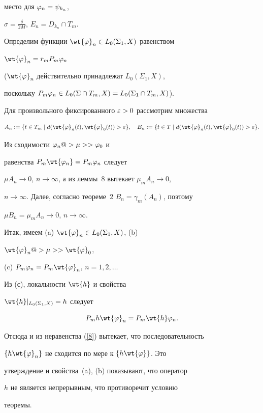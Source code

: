 \begin{pf}
место для $\varphi_n=\psi_{k_n}$,


$\sigma=\frac{\delta}{2M}$, $E_n=D_{k_n}\cap T_m$.





Определим функции $\wt{\f}_n\in L_0(\Sigma_1,X)$ равенством


$\wt{\f}_n=r_mP_m\f_n$


($\wt{\f}_n$ действительно принадлежат $L_0(\Sigma_1,X)$,


поскольку $P_m\varphi_n\in L_0(\Sigma\cap T_m,X)=L_0(\Sigma_1\cap T_m,X)$).


Для произвольного фиксированного $\varepsilon >0$ рассмотрим множества


$$


A_n:=\{t\in T_m\mid d(\wt{\f}_n(t),\wt{\f}_0(t))>\e\}, \quad


B_n:=\{t\in T\mid d(\wt{\f}_n(t),\wt{\f}_0(t))>\e\}.


$$


Из сходимости $\varphi_n@>{\mu}>>\varphi_0$ и


равенства $P_m\wt{\f_n}=P_m\f_n$ следует


$\mu A_n\to 0$, $n\to\infty$, а из леммы~8 вытекает $\mu_mA_n\to 0$,


$n\to\infty$. Далее, согласно теореме~2\; $B_n=\gamma_m(A_n)$, поэтому


$\mu B_n=\mu_mA_n\to 0$, $n\to\infty$.





Итак, имеем (a) $\wt{\f}_n\in L_0(\Sigma_1,X)$, (b)


$\wt{\f}_n@>{\mu}>>\wt{\f}_0$,


(c) $P_m\f_n=P_m\wt{\f}_n$, $n=1,2,\dotsc$





Из (с), локальности $\wt{h}$ и свойства


$\wt{h}|_{L_0(\Sigma_1,X)}=h$ следует


$$


P_mh\wt{\f}_n=P_m\wt{h}\f_n.


$$


Отсюда и из неравенства (\ref{8}) вытекает, что последовательность


$\{h\wt{\f}_n\}$ не сходится по мере к $\{h\wt{\f}\}$. Это


утверждение и свойства~(a), (b) показывают, что оператор


$h$ не является непрерывным, что противоречит условию


теоремы.


\end{pf}






